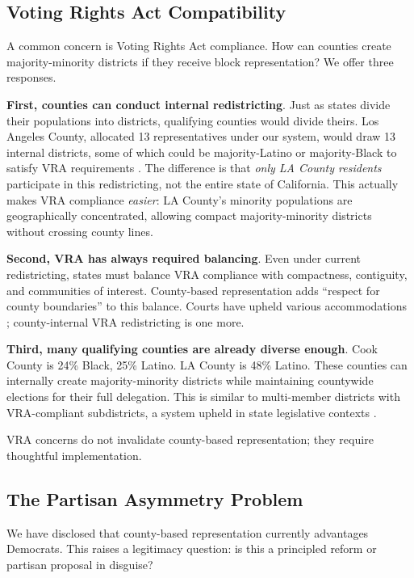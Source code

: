 \subsection{Voting Rights Act Compatibility}

A common concern is Voting Rights Act compliance. How can counties create majority-minority districts if they receive block representation? We offer three responses.

\textbf{First, counties can conduct internal redistricting}. Just as states divide their populations into districts, qualifying counties would divide theirs. Los Angeles County, allocated 13 representatives under our system, would draw 13 internal districts, some of which could be majority-Latino or majority-Black to satisfy VRA requirements \citep{grofman1982representation}. The difference is that \emph{only LA County residents} participate in this redistricting, not the entire state of California. This actually makes VRA compliance \emph{easier}: LA County's minority populations are geographically concentrated, allowing compact majority-minority districts without crossing county lines.

\textbf{Second, VRA has always required balancing}. Even under current redistricting, states must balance VRA compliance with compactness, contiguity, and communities of interest. County-based representation adds ``respect for county boundaries'' to this balance. Courts have upheld various accommodations \citep{thornburg1986gingles}; county-internal VRA redistricting is one more.

\textbf{Third, many qualifying counties are already diverse enough}. Cook County is 24\% Black, 25\% Latino. LA County is 48\% Latino. These counties can internally create majority-minority districts while maintaining countywide elections for their full delegation. This is similar to multi-member districts with VRA-compliant subdistricts, a system upheld in state legislative contexts \citep{zimmer1973voting}.

VRA concerns do not invalidate county-based representation; they require thoughtful implementation.

\subsection{The Partisan Asymmetry Problem}

We have disclosed that county-based representation currently advantages Democrats. This raises a legitimacy question: is this a principled reform or partisan proposal in disguise?

